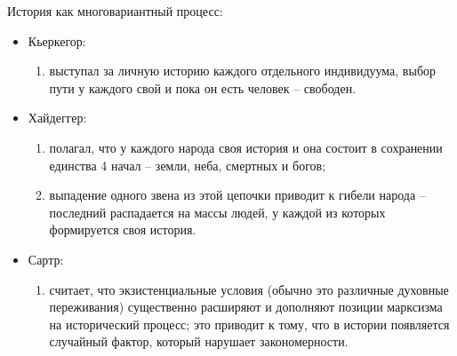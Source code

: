 История как многовариантный процесс:
\begin{itemize}
	\item Кьеркегор:
	\begin{enumerate}
		\item выступал за личную историю каждого отдельного индивидуума, выбор пути у каждого свой и пока он есть человек -- свободен.
	\end{enumerate}
	\item Хайдеггер:
	\begin{enumerate}
		\item полагал, что у каждого народа своя история и она состоит в сохранении единства 4 начал -- земли, неба, смертных и богов;
		\item выпадение одного звена из этой цепочки приводит к гибели народа -- последний распадается на массы людей, у каждой из которых формируется своя история. 
	\end{enumerate}
	\item Сартр:
	\begin{enumerate}
		\item считает, что экзистенциальные условия (обычно это различные духовные переживания) существенно расширяют и дополняют позиции марксизма на исторический процесс; это приводит к тому, что в истории появляется случайный фактор, который нарушает закономерности.
	\end{enumerate}
\end{itemize}